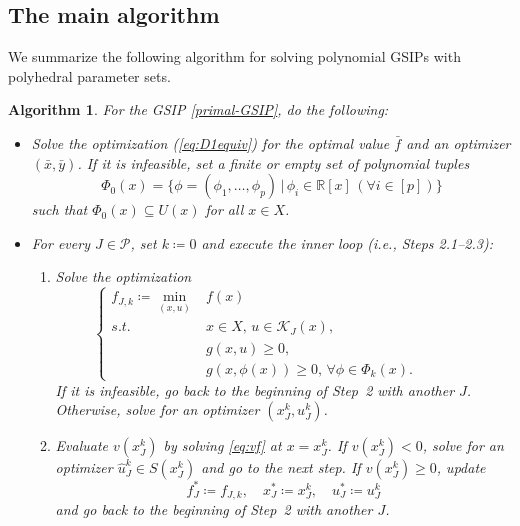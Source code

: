 \documentclass{amsart}
\newcommand{\reff}[1]{(\ref{#1})}
\theoremstyle{plain}
\newtheorem{algorithm}[theorem]{Algorithm}
\newcommand{\re}{\mathbb{R}}
\newcommand{\st}{\mathit{s.t.}}
\newcommand{\mc}[1]{\mathcal{#1}}
\numberwithin{equation}{section}
\begin{document}
		\subsection{The main algorithm}
		We summarize the following algorithm for solving polynomial GSIPs with polyhedral 
		parameter sets. 
		\begin{algorithm}\label{alg:1}
			For the GSIP \eqref{primal-GSIP}, do the following:
			\begin{itemize}
				
				\item[{\bf Step~1}]
				Solve the optimization \reff{eq:D1equiv} for the optimal value 
				$\bar{f}$ and an optimizer $(\bar{x}, \bar{y})$.
				If it is infeasible, set a finite or empty set of polynomial tuples
				\begin{equation}\label{eq:Phi0}
					\Phi_0(x) = \{\phi = (\phi_1,\ldots, \phi_p)\,\vert\, 
					\phi_i\in \re[x]\,(\forall i\in [p])\}
				\end{equation}
				such that $\Phi_0(x)\subseteq U(x)$ for all $x\in X$.
				
				\item [{\bf Step~2}] 
				For every $J\in\mc{P}$, set $k\coloneqq 0$ and execute the inner loop (i.e., Steps 2.1--2.3):
				\begin{enumerate}
					\item[Step 2.1] Solve the optimization 
					\begin{equation}\label{eq:PJk}
						\left\{\begin{array}{rl}
							f_{J,k} \coloneqq \min\limits_{(x,u)} & f(x)\\
							\st &x\in X,\, u\in \mc{K}_{J}(x),\\
							& g(x,u) \ge 0,\\
							& g(x,\phi(x))\ge 0,\, \forall \phi\in \Phi_k(x).
						\end{array}
						\right.\qquad\qquad
					\end{equation}
					If it is infeasible,
					go back to the beginning of Step~2 with another $J$.
					Otherwise, solve for an optimizer $(x_J^k, u_J^k)$.
					
					\item[Step 2.2]  
					Evaluate $v(x_J^k)$ by solving \eqref{eq:vf} at $x = x_J^k$.
					If $v(x_J^k)<0$, solve for an optimizer $\hat{u}_J^{k}\in S(x_J^k)$ and go to 
					the next step. If $v(x_J^k)\ge 0$, update
					\[
					f_J^* \coloneqq f_{J,k},\quad x_J^* \coloneqq  x_J^k,\quad
					u_J^* \coloneqq u_J^k 
					\]
					and go back to the beginning of Step~2 with another $J$. 
					

\end{enumerate}
\end{itemize}
\end{algorithm}
\end{document}
